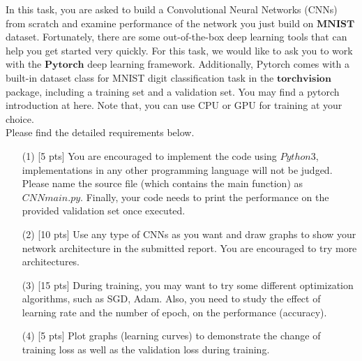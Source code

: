 \begin{problem}
    In this task, you are asked to build a Convolutional Neural Networks (CNNs) from scratch and examine performance of the network you just build on $\textbf{MNIST}$ dataset. Fortunately, there are some out-of-the-box deep learning tools that can help you get started very quickly. For this task, we would like to ask you to work with the $\textbf{Pytorch}$ deep learning framework. Additionally, Pytorch comes with a built-in dataset class for MNIST digit classiﬁcation task in the $\textbf{torchvision}$ package, including a training set and a validation set. You may ﬁnd a pytorch introduction at here. Note that, you can use CPU or GPU for training at your choice.\\
    Please ﬁnd the detailed requirements below.
    \begin{enumerate}
        \item[(1)][5 pts] You are encouraged to implement the code using $Python3$, implementations in any other programming language will not be judged. Please name the source ﬁle (which contains the main function) as $CNN main.py$. Finally, your code needs to print the performance on the provided validation set once executed.
        \item[(2)][10 pts] Use any type of CNNs as you want and draw graphs to show your network architecture in the submitted report. You are encouraged to try more architectures.
        \item[(3)][15 pts] During training, you may want to try some diﬀerent optimization algorithms, such as SGD, Adam. Also, you need to study the eﬀect of learning rate and the number of epoch, on the performance (accuracy).
        \item[(4)][5 pts] Plot graphs (learning curves) to demonstrate the change of training loss as well as the validation loss during training.
    \end{enumerate}
\end{problem}



